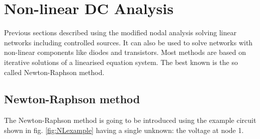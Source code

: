 \section{Non-linear DC Analysis}

Previous sections described using the modified nodal analysis solving
linear networks including controlled sources.  It can also be used to
solve networks with non-linear components like diodes and transistors.
Most methods are based on iterative solutions of a linearised equation
system.  The best known is the so called Newton-Raphson method.

\subsection{Newton-Raphson method}
\label{sec:NRmethod}

The Newton-Raphson method is going to be introduced using the example
circuit shown in fig. \ref{fig:NLexample} having a single unknown: the
voltage at node 1.

